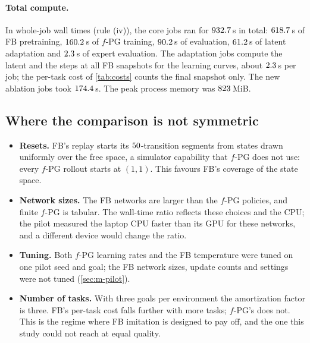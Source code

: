 \paragraph{Total compute.}
In whole-job wall times (rule (iv)), the  core jobs ran for $\vn{s14.wall.total}{932.7}$\,s in total: $\vn{s14.wall.fb}{618.7}$\,s of FB pretraining, $\vn{s14.wall.fpg}{160.2}$\,s of $f$-PG training, $\vn{s14.wall.eval}{90.2}$\,s of evaluation, $\vn{s14.wall.adapt}{61.2}$\,s of latent adaptation and $\vn{s14.wall.evalexp}{2.3}$\,s of expert evaluation. The adaptation jobs compute the \ERFB{} latent and the \DMFB{} steps at all  FB snapshots for the learning curves, about $\vn{s14.adapt_job}{2.3}$\,s per job; the per-task cost of \cref{tab:costs} counts the final snapshot only. The  new ablation jobs took $\vn{s14.abl.wall}{174.4}$\,s. The peak process memory was $\vn{s14.peak}{823}$\,MiB.

\subsection{Where the comparison is not symmetric}

\begin{itemize}[nosep]
\item \textbf{Resets.} FB's replay starts its $\vn{replay.segment}{50}$-transition segments from states drawn uniformly over the free space, a simulator capability that $f$-PG does not use: every $f$-PG rollout starts at $(1,1)$. This favours FB's coverage of the state space.
\item \textbf{Network sizes.} The FB networks are larger than the $f$-PG policies, and finite $f$-PG is tabular. The wall-time ratio reflects these choices and the CPU; the pilot measured the laptop CPU faster than its GPU for these networks, and a different device would change the ratio.
\item \textbf{Tuning.} Both $f$-PG learning rates and the FB temperature were tuned on one pilot seed and goal; the FB network sizes, update counts and \DMFB{} settings were not tuned (\cref{sec:m-pilot}).
\item \textbf{Number of tasks.} With three goals per environment the amortization factor is three. FB's per-task cost falls further with more tasks; $f$-PG's does not. This is the regime where FB imitation is designed to pay off, and the one this study could not reach at equal quality.
\end{itemize}
